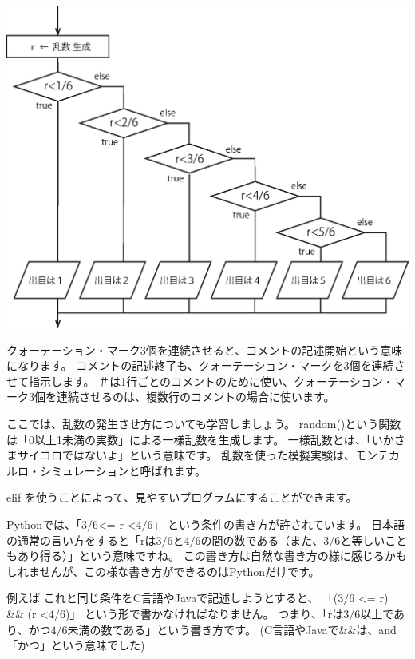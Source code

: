 \documentclass[uplatex,a4paper,11pt,oneside,openany]{jsbook}
\begin{document}
\begin{center}
	\includegraphics[scale=0.45]{figures/eps/if-else.eps}
\end{center}

クォーテーション・マーク3個を連続させると、コメントの記述開始という意味になります。
コメントの記述終了も、クォーテーション・マークを3個を連続させて指示します。
＃は1行ごとのコメントのために使い、クォーテーション・マーク3個を連続させるのは、複数行のコメントの場合に使います。

ここでは、乱数の発生させ方についても学習しましょう。
random()という関数は「0以上1未満の実数」による一様乱数を生成します。
一様乱数とは、「いかさまサイコロではないよ」という意味です。
乱数を使った模擬実験は、モンテカルロ・シミュレーションと呼ばれます。

elif を使うことによって、見やすいプログラムにすることができます。



Pythonでは、「$3/6$\textless= r \textless$4/6$」 という条件の書き方が許されています。
日本語の通常の言い方をすると「rは$3/6$と$4/6$の間の数である（また、$3/6$と等しいこともあり得る）」という意味ですね。
この書き方は自然な書き方の様に感じるかもしれませんが、この様な書き方ができるのはPythonだけです。

例えば
これと同じ条件をC言語やJavaで記述しようとすると、
「($3/6$ \textless= r) \&\& (r \textless $4/6$)」 という形で書かなければなりません。
つまり、「rは$3/6$以上であり、かつ$4/6$未満の数である」という書き方です。
(C言語やJavaで\&\&は、and「かつ」という意味でした)
\end{document}
